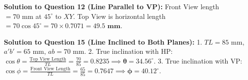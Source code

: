 \noindent \textbf{Solution to Question 12 (Line Parallel to VP):}  
Front View length $= 70\text{ mm}$ at $45^\circ$ to $XY$. Top View is horizontal length $= 70 \cos 45^\circ = 70 \times 0.7071 = \mathbf{49.5\text{ mm}}$.

\noindent \textbf{Solution to Question 15 (Line Inclined to Both Planes):}  
1. $TL = 85\text{ mm}$, $a'b' = 65\text{ mm}$, $ab = 70\text{ mm}$.
2. True inclination with HP: $\cos \theta = \frac{\text{Top View Length}}{TL} = \frac{70}{85} = 0.8235 \implies \mathbf{\theta = 34.56^\circ}$.
3. True inclination with VP: $\cos \phi = \frac{\text{Front View Length}}{TL} = \frac{65}{85} = 0.7647 \implies \mathbf{\phi = 40.12^\circ}$.
